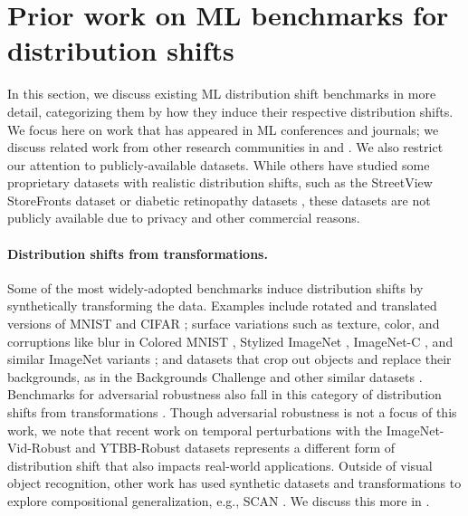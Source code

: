 \section{Prior work on ML benchmarks for distribution shifts}\label{sec:app_related}

In this section, we discuss existing ML distribution shift benchmarks in more detail, categorizing them by how they induce their respective distribution shifts.
We focus here on work that has appeared in ML conferences and journals; we discuss related work from other research communities in  and .
We also restrict our attention to publicly-available datasets.
While others have studied some proprietary datasets with realistic distribution shifts, such as the StreetView StoreFronts dataset \citep{hendrycks2020many} or diabetic retinopathy datasets \citep{damour2020underspecification}, these datasets are not publicly available due to privacy and other commercial reasons.

\paragraph{Distribution shifts from transformations.} Some of the most widely-adopted benchmarks induce distribution shifts by synthetically transforming the data.
Examples include rotated and translated versions of MNIST and CIFAR \citep{worrall2017harmonic,gulrajani2020search};
surface variations such as texture, color, and corruptions like blur in Colored MNIST \citep{gulrajani2020search}, Stylized ImageNet \citep{geirhos2018imagenet}, ImageNet-C \citep{hendrycks2019benchmarking},
and similar ImageNet variants  \citep{geirhos2018generalisation};
and datasets that crop out objects and replace their backgrounds, as in the Backgrounds Challenge \citep{xiao2020noise} and other similar datasets \citep{sagawa2020group, koh2020bottleneck}.
Benchmarks for adversarial robustness also fall in this category of distribution shifts from transformations \citep{goodfellow2015explaining,croce2020robustbench}.
Though adversarial robustness is not a focus of this work,
we note that recent work on temporal perturbations with the ImageNet-Vid-Robust and YTBB-Robust datasets \citep{shankar2019image}
represents a different form of distribution shift that also impacts real-world applications.
Outside of visual object recognition, other work has used synthetic datasets and transformations to explore compositional generalization, e.g., SCAN \citep{lake2018generalization}.
We discuss this more in .

